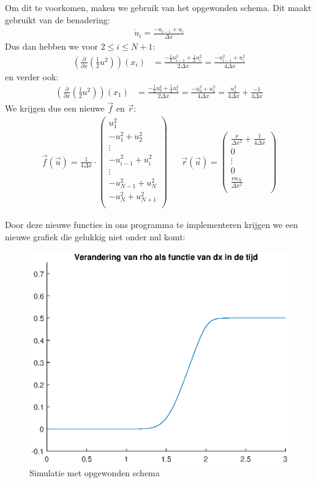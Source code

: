 \documentclass{article}
\begin{document}
Om dit te voorkomen, maken we gebruik van het opgewonden schema.
Dit maakt gebruikt van de benadering:
\begin{align*}
\dot{u}_{i} =\frac{-u_{i-1}+u_{i}}{\Delta x}
\end{align*}
Dus dan hebben we voor $2\leq i \leq N+1$:
\begin{align*}
\left(\frac{\partial}{\partial x}\left(\frac{1}{2}u^2\right)\right)(x_i) &= \frac{-\frac{1}{2}u_{i-1}^2+\frac{1}{2}u_{i}^2}{2\Delta x}
= \frac{-u_{i-1}^2+u_{i}^2}{4\Delta x}
\end{align*}
en verder ook:
\begin{align*}
\left(\frac{\partial}{\partial x}\left(\frac{1}{2}u^2\right)\right)(x_1) &= \frac{-\frac{1}{2}u_{0}^2+\frac{1}{2}u_{1}^2}{2\Delta x}
= \frac{-u_{0}^2+u_{1}^2}{4\Delta x}
=\frac{u_1^2}{4\Delta x} + \frac{-1}{4\Delta x}
\end{align*}
We krijgen dus een nieuwe $\vec{f}$ en $\vec{r}$:
\begin{align*}
\vec{f}(\vec{u}) =
\frac{1}{4\Delta x} \cdot
\begin{pmatrix}
u_1^2\\
-u_1^2 + u_2^2\\
\vdots\\
-u_{i-1}^2+u_{i}^2\\
\vdots\\
-u_{N-1}^2+u_{N}^2\\
-u_N^2+u_{N+1}^2\\
\end{pmatrix}
 &&
\vec{r}(\vec{u}) = 
\begin{pmatrix}
\frac{\nu}{\Delta x^2} + \frac{1}{4\Delta x}\\
0\\
\vdots\\
0\\
\frac{\nu u_N}{\Delta x^2}\\
\end{pmatrix}
\end{align*}

Door deze nieuwe functies in ons programma te implementeren krijgen we een nieuwe grafiek die gelukkig niet onder nul komt:

\begin{figure}[H]
\centering
\includegraphics[scale=0.8]{6goed.eps}
\caption{Simulatie met opgewonden schema}
\end{figure}
\end{document}
